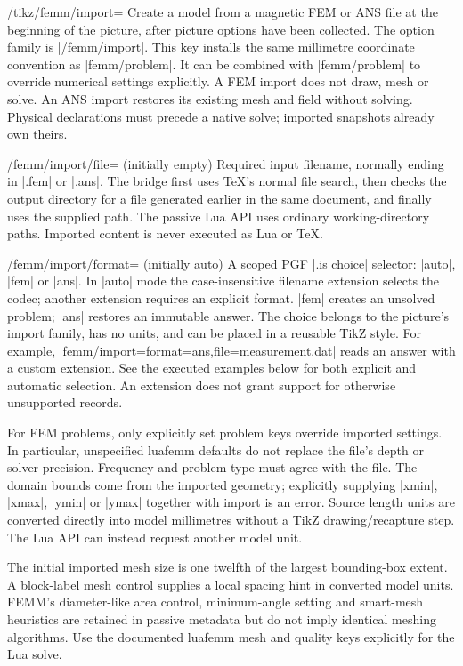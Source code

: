 \begin{key}{/tikz/femm/import=}
Create a model from a magnetic FEM or ANS file at the beginning of the picture, after
picture options have been collected. The option family is |/femm/import|.
This key installs the same millimetre coordinate convention as |femm/problem|.
It can be combined with |femm/problem| to override numerical settings explicitly.
A FEM import does not draw, mesh or solve. An ANS import restores its existing
mesh and field without solving. Physical declarations must precede a native solve;
imported snapshots already own theirs.
\end{key}
\begin{key}{/femm/import/file= (initially empty)}
Required input filename, normally ending in |.fem| or |.ans|. The bridge first uses TeX's normal
file search, then checks the output directory for a file generated earlier in
the same document, and finally uses the supplied path. The passive Lua API uses
ordinary working-directory paths. Imported content is never executed as Lua or TeX.
\end{key}

\begin{key}{/femm/import/format= (initially auto)}
A scoped PGF |.is choice| selector: |auto|, |fem| or |ans|. In |auto| mode the
case-insensitive filename extension selects the codec; another extension requires
an explicit format. |fem| creates an unsolved problem; |ans| restores an immutable
answer. The choice belongs to the picture's import family, has no units, and can
be placed in a reusable TikZ style. For example,
|femm/import={format=ans,file=measurement.dat}| reads an answer with a custom
extension. See the executed examples below for both explicit and automatic
selection. An extension does not grant support for otherwise unsupported records.
\end{key}

For FEM problems, only explicitly set problem keys override imported settings. In particular,
unspecified luafemm defaults do not replace the file's depth or solver precision.
Frequency and problem type must agree with the file. The domain bounds come from the imported geometry; explicitly supplying |xmin|,
|xmax|, |ymin| or |ymax| together with import is an error. Source length units are
converted directly into model millimetres without a TikZ drawing/recapture step.
The Lua API can instead request another model unit.

The initial imported mesh size is one twelfth of the largest bounding-box extent.
A block-label mesh control supplies a local spacing hint in converted model units.
FEMM's diameter-like area control, minimum-angle setting and smart-mesh heuristics
are retained in passive metadata but do not imply identical meshing algorithms.
Use the documented luafemm mesh and quality keys explicitly for the Lua solve.

